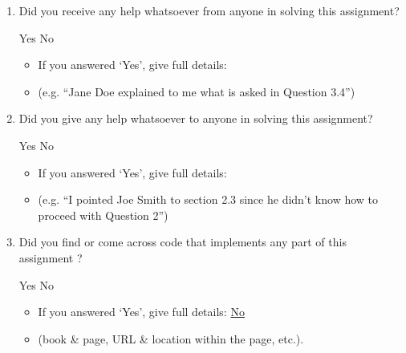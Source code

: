 \documentclass[11pt,addpoints,answers]{exam}
\numberwithin{equation}{section} %
\numberwithin{figure}{section} %
\numberwithin{table}{section} %
\begin{document}
\begin{enumerate}
    \item Did you receive any help whatsoever from anyone in solving this assignment?
    \begin{checkboxes}
     \choice Yes
     \CorrectChoice No
    \end{checkboxes}
    \begin{itemize}
        \item If you answered `Yes', give full details:
        \item (e.g. “Jane Doe explained to me what is asked in Question 3.4”)
    \end{itemize}

    \begin{tcolorbox}[fit,height=3cm,blank, borderline={1pt}{-2pt},nobeforeafter]
    \end{tcolorbox}

    \item Did you give any help whatsoever to anyone in solving this assignment?
    \begin{checkboxes}
     \choice Yes
     \CorrectChoice No
    \end{checkboxes}
    \begin{itemize}
        \item If you answered `Yes', give full details:
        \item (e.g. “I pointed Joe Smith to section 2.3 since he didn’t know how to proceed with Question 2”)
    \end{itemize}

    \begin{tcolorbox}[fit,height=3cm,blank, borderline={1pt}{-2pt},nobeforeafter]
    \end{tcolorbox}

    \item Did you find or come across code that implements any part of this assignment ? 
    \begin{checkboxes}
     \choice Yes
     \CorrectChoice No
    \end{checkboxes}
    \begin{itemize}
        \item If you answered `Yes', give full details: \underline{No}
        \item (book \& page, URL \& location within the page, etc.).
    \end{itemize}
    \begin{tcolorbox}[fit,height=3cm,blank, borderline={1pt}{-2pt},nobeforeafter]
    \end{tcolorbox}
\end{enumerate}
\end{document}
